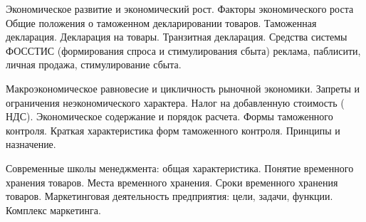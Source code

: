 \documentclass[
	11pt,
	a4paper,
	]
	{article}
\begin{document}
\bigskip

\noindent{} 
	{
		Экономическое развитие и экономический рост. Факторы экономического роста
	}{
		Общие положения о таможенном декларировании товаров. Таможенная декларация. Декларация на товары. Транзитная декларация.
	}{
		Средства системы ФОССТИС (формирования спроса и стимулирования сбыта) реклама, паблисити, личная продажа, стимулирование сбыта.
	}

\bigskip

\noindent{} 
	{
		Макроэкономическое равновесие и цикличность рыночной экономики. Запреты и ограничения неэкономического характера.
	}{
		Налог на добавленную стоимость ( НДС). Экономическое содержание и порядок расчета.
	}{
		Формы таможенного контроля. Краткая характеристика форм таможенного контроля. Принципы и назначение.
	}

\bigskip

\noindent{} 
	{
		Современные школы менеджмента: общая характеристика.
	}{
		Понятие временного хранения товаров. Места временного хранения. Сроки временного хранения товаров.
	}{
		Маркетинговая деятельность предприятия: цели, задачи, функции. Комплекс маркетинга.
	}

\bigskip
\end{document}
